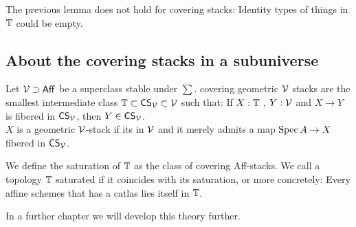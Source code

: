 \begin{warning}
	The previous lemma does not hold for covering stacks: Identity types of things in $\mathbb{T}$ could be empty.
\end{warning}

\subsection{About the covering stacks in a subuniverse}
\begin{definition}
	Let $\mathcal{V} \supset \mathsf{Aff}$ be a superclass stable under $\sum$. covering geometric $\mathcal{V}$ stacks are the smallest intermediate class $\mathbb{T} \subset \mathsf{CS}_{\mathcal{V}} \subset \mathcal{V}$ such that: If $X : \mathbb{T}$ ,  $Y : \mathcal{V}$ and $X \to Y$ is fibered in $\mathsf{CS}_{\mathcal{V}}$, then $Y \in \mathsf{CS}_{\mathcal{V}}$. \\
	$X$ is a geometric $\mathcal{V}$-stack if its in $\mathcal{V}$ and it merely admits a map $\operatorname{Spec} A \to X$ fibered in $\mathsf{CS}_{\mathcal{V}}$.
\end{definition}
\begin{definition}
	We define the saturation of $\mathbb{T}$ as the class of covering Aff-stacks. We call a topology $\mathbb{T}$ saturated if it coincides with its saturation, or more concretely: Every affine schemes that has a catlas lies itself in $\mathbb{T}$. \\ 
\end{definition}
In a further chapter we will develop this theory further.



